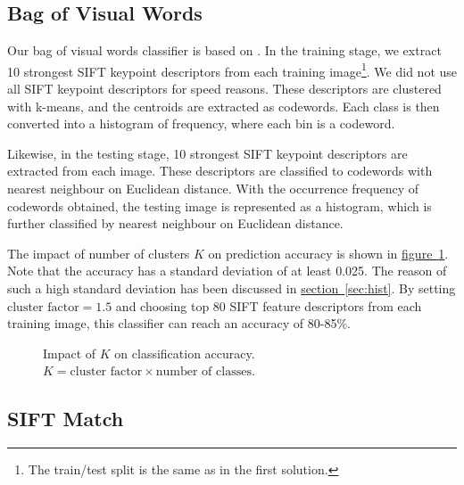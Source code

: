 \documentclass[11pt,a4paper]{article}
\begin{document}
\subsection{Bag of Visual Words}
\label{sec:bovw}

Our bag of visual words classifier is based on \cite{shackenbergbovw}. In the training stage, we extract 10 strongest SIFT keypoint descriptors from each training image\footnote{The train/test split is the same as in the first solution.}. We did not use all SIFT keypoint descriptors for speed reasons. These descriptors are clustered with k-means, and the centroids are extracted as codewords. Each class is then converted into a histogram of frequency, where each bin is a codeword.

Likewise, in the testing stage, 10 strongest SIFT keypoint descriptors are extracted from each image. These descriptors are classified to codewords with nearest neighbour on Euclidean distance. With the occurrence frequency of codewords obtained, the testing image is represented as a histogram, which is further classified by nearest neighbour on Euclidean distance.

The impact of number of clusters $K$ on prediction accuracy is shown in \hyperref[fig:bovw_exp]{figure~\ref{fig:bovw_exp}}. Note that the accuracy has a standard deviation of at least 0.025. The reason of such a high standard deviation has been discussed in \hyperref[sec:hist]{section~\ref{sec:hist}}. By setting $\text{cluster factor}=1.5$ and choosing top 80 SIFT feature descriptors from each training image, this classifier can reach an accuracy of 80-85\%.

\begin{figure}[htbp]
\centering
{}
\caption{Impact of $K$ on classification accuracy. $K=\text{cluster factor}\times\text{number of classes}.$}
\label{fig:bovw_exp}
\end{figure}

\newpage
\subsection{SIFT Match}
\end{document}
